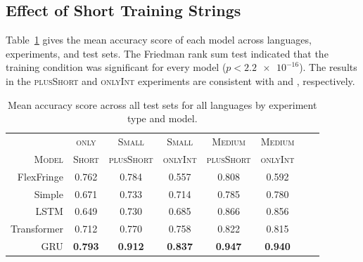 \documentclass[twoside,11pt]{article}
\newcommand{\tscx}[1]{\textsc{#1}\xspace}
\newcommand{\sm}{\tscx{Small}}
\newcommand{\med}{\tscx{Medium}}
\newcommand{\plusShort}{\tscx{plusShort}}
\newcommand{\onlyInt}{\tscx{onlyInt}}
\begin{document}
\subsection{Effect of Short Training Strings} \label{sec:res-short}

Table~\ref{tab:overall-scores} gives the mean accuracy score of each
model across languages, experiments, and test sets. The Friedman rank
sum test indicated that the training condition was significant for
every model (\(p < \num{2.2e-16}\)). The results in the
\plusShort and \onlyInt experiments are consistent
with \citet{adil23} and \citet{mlregtest}, respectively.

\begin{table}[t!]
\centering
\begin{tabular}{rccccccc}
  \toprule
                 & \textsc{only}  & \sm            & \sm            & \med           & \med           \\
  \textsc{Model} & \textsc{Short} & \plusShort     & \onlyInt       & \plusShort     & \onlyInt       \\
  \midrule
   FlexFringe   & 0.762          & 0.784          & 0.557          & 0.808          & 0.592          \\
   Simple       & 0.671          & 0.733          & 0.714          & 0.785          & 0.780          \\
   LSTM         & 0.649          & 0.730          & 0.685          & 0.866          & 0.856          \\
   Transformer  & 0.712          & 0.770          & 0.758          & 0.822          & 0.815          \\
   GRU          & \textbf{0.793} & \textbf{0.912} & \textbf{0.837} & \textbf{0.947} & \textbf{0.940} \\
  \bottomrule
\end{tabular}
\caption{Mean accuracy score across all test sets for all languages by
  experiment type and model.}
\label{tab:overall-scores}
\end{table}



\end{document}
